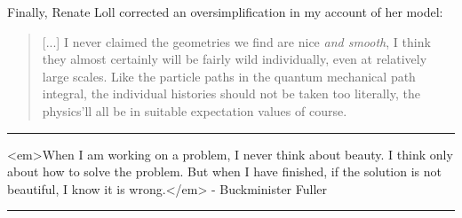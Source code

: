 Finally, Renate Loll corrected an oversimplification in my
account of her model:
\begin{quote}
[...] I never claimed the geometries
we find are nice \emph{and smooth}, I think they almost certainly
will be fairly wild individually, even at relatively large
scales. Like the particle paths in the quantum mechanical
path integral, the individual histories should not be taken
too literally, the physics'll all be in suitable expectation
values of course.
\end{quote}

\par\noindent\rule{\textwidth}{0.4pt}
<em>When I am working on a problem, I never think about
beauty. I think only about how to solve the problem.
But when I have finished, if the solution is not
beautiful, I know it is wrong.</em> - Buckminister Fuller
\par\noindent\rule{\textwidth}{0.4pt}

